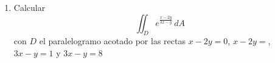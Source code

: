 \documentclass{article}
\begin{document}
\begin{enumerate}
        \item {
            Calcular
            \[
                \iint_{D}{e^{\frac{x-2y}{3x-y}}\,dA}
            \]
            con $D$ el paralelogramo acotado por las rectas $x-2y=0$, $x-2y=$,
            $3x-y=1$ y $3x-y=8$

            \color{azul}

            


}
\end{enumerate}
\end{document}
